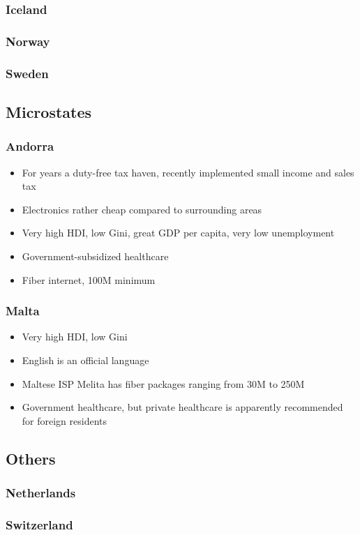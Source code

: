 \documentclass[12pt]{article}
\begin{document}
\subsubsection{Iceland}

\subsubsection{Norway}

\subsubsection{Sweden}



\subsection{Microstates}


\subsubsection{Andorra}

\begin{itemize}
\item For years a duty-free tax haven, recently implemented small income and sales tax
\item Electronics rather cheap compared to surrounding areas
\item Very high HDI, low Gini, great GDP per capita, very low unemployment
\item Government-subsidized healthcare
\item Fiber internet, 100M minimum
\end{itemize}



\subsubsection{Malta}

\begin{itemize}
\item Very high HDI, low Gini
\item English is an official language
\item Maltese ISP Melita has fiber packages ranging from 30M to 250M
\item Government healthcare, but private healthcare is apparently recommended for foreign residents
\end{itemize}

\subsection{Others}


\subsubsection{Netherlands}

\subsubsection{Switzerland}
\end{document}
